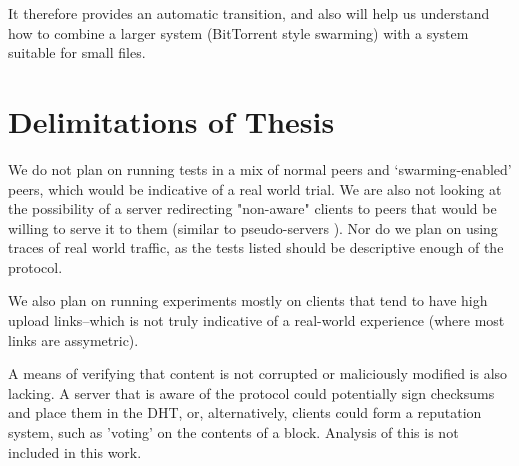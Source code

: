 It therefore provides an automatic transition, and also will help us understand how to combine a larger system (BitTorrent style swarming) with a system suitable for small files.

\section {Delimitations of Thesis}
We do not plan on running tests in a mix of normal peers and `swarming-enabled' peers, which would be indicative of a real world trial.  We are also not looking at the possibility of a server redirecting "non-aware" clients to peers that would be willing to serve it to them (similar to pseudo-servers \cite{pseudoserving}).  Nor do we plan on using traces of real world traffic, as the tests listed should be descriptive enough of the protocol.

We also plan on running experiments mostly on clients that tend to have high upload links--which is not truly indicative of a real-world experience (where most links are assymetric).

A means of verifying that content is not corrupted or maliciously modified is also lacking.  A server that is aware of the protocol could potentially sign checksums and place them in the DHT, or, alternatively, clients could form a reputation system, such as 'voting' on the contents of a block.  Analysis of this is not included in this work.

